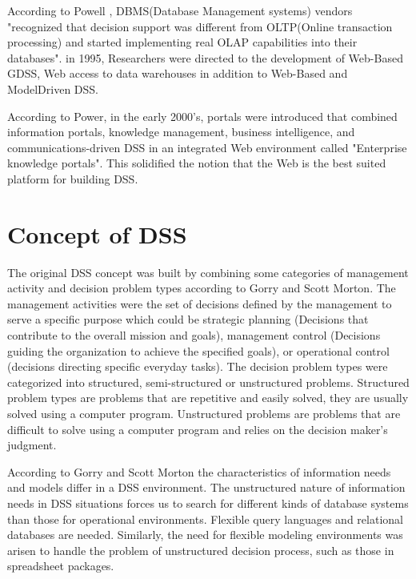 \indent According to Powell \cite{powell2001dm}, DBMS(Database Management systems) vendors "recognized that decision support was different from OLTP(Online transaction processing) and started implementing real OLAP capabilities into their databases". in 1995, Researchers were directed to the development of Web-Based GDSS, Web access to data warehouses in addition to Web-Based and ModelDriven DSS.

According to Power\cite{power2007brief}, in the early 2000's, portals were introduced that combined information portals, knowledge management, business intelligence, and communications-driven DSS in an integrated Web environment called "Enterprise knowledge portals". This solidified the notion that the Web is the best suited platform for building DSS.
\section{Concept of DSS}
\label{sec:FoundationsConcept}
\indent The original DSS concept was built by combining some categories of management activity and decision problem types according to Gorry and Scott Morton.\cite{gorry1989framework} The management activities were the set of decisions defined by the management to serve a specific purpose which could be strategic planning (Decisions that contribute to the overall mission and goals), management control (Decisions guiding the organization to achieve the specified goals), or operational control (decisions directing specific everyday tasks). The decision problem types were categorized into structured, semi-structured or unstructured problems. Structured problem types are problems that are repetitive and easily solved, they are usually solved using a computer program. Unstructured problems are problems that are difficult to solve using a computer program and relies on the decision maker's judgment.\cite{shim2002past}

\indent According to Gorry and Scott Morton the characteristics of information needs and models differ in a DSS environment. The unstructured nature of information needs in DSS situations forces us to search for different kinds of database systems than those for operational environments. Flexible query languages and relational databases are needed. Similarly, the need for flexible modeling environments was arisen to handle the problem of unstructured decision process, such as those in spreadsheet packages.\cite{shim2002past}

